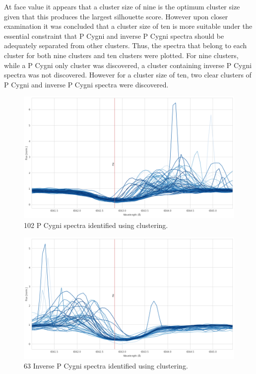 At face value it appears that a cluster size of nine is the optimum cluster size given that this produces the largest silhouette score. However upon closer examination it was concluded that a cluster size of ten is more suitable under the essential constraint that P Cygni and inverse P Cygni spectra should be adequately separated from other clusters. Thus, the spectra that belong to each cluster for both nine clusters and ten clusters were plotted. For nine clusters, while a P Cygni only cluster was discovered, a cluster containing inverse P Cygni spectra was not discovered. However for a cluster size of ten, two clear clusters of P Cygni and inverse P Cygni spectra were discovered.

\begin{figure}[!htb]
\centering
\includegraphics[scale=0.45]{figures/pcygni.png}
\caption{102 P Cygni spectra identified using clustering.}
\end{figure}

\begin{figure}[!htb]
\centering
\includegraphics[scale=0.45]{figures/inverse p cygni.png}
\caption{63 Inverse P Cygni spectra identified using clustering.}
\end{figure}

